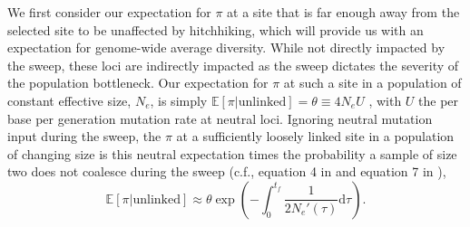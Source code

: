 \documentclass[]{article}
\begin{document}
We first consider our expectation for $\pi$ at a site that is far enough away from the selected site to be unaffected by hitchhiking, which will provide us with an expectation for  genome-wide average diversity.
While not directly impacted by the sweep, these loci are indirectly impacted as the sweep dictates the severity of the population bottleneck.
Our expectation for $\pi$ at such a site in a population of constant effective size, $N_e$, is simply $\mathbb{E}[\pi | \mathrm{unlinked}] = \theta \equiv 4 N_e U$ \citep{watterson1975number}, with $U$ the per base per generation mutation rate at neutral loci.
Ignoring neutral mutation input during the sweep, the $\pi$ at a sufficiently loosely linked site in a population of changing size is this neutral expectation times the probability a sample of size two does not coalesce during the sweep (c.f., equation 4 in \citealp{slatkin1991pairwise} and equation 7 in \citealp{griffiths1994sampling}),
\begin{equation}\label{eq:EH_rescue_loose}
\mathbb{E}[\pi | \mathrm{unlinked}]\approx \theta \exp \left( - \int_0^{t_f} \frac{1}{2N_e'(\tau)} \mathrm{d}\tau \right). 
\end{equation}
\end{document}
